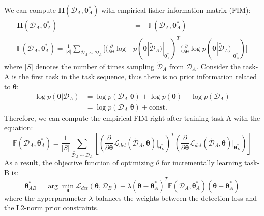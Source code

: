 \documentclass{article}
\begin{document}
We can compute $\boldsymbol{H}(\mathcal D_A, \boldsymbol{\theta}_A^*)$
with empirical fisher information matrix (FIM):
\begin{equation}
\begin{split}
\boldsymbol{H}(\mathcal D_A, \boldsymbol{\theta}_A^*)
&= - \mathbb{F}(\mathcal D_A, \boldsymbol{\theta}_A^*) \\
\mathbb{F}(\mathcal D_A, \boldsymbol{\theta}_A^*)
= \frac{1}{|S|}
\sum_{\tilde{\mathcal D}_A \sim \mathcal D_A}
[(\frac{\partial}{\partial \boldsymbol{\theta}} \log& p(\boldsymbol{\theta}|\tilde{\mathcal D}_A)|_{\boldsymbol{\theta}_A^*})^T
(\frac{\partial}{\partial \boldsymbol{\theta}} \log p(\boldsymbol{\theta}|\tilde{\mathcal D}_A)|_{\boldsymbol{\theta}_A^*})]
\end{split}
\end{equation}
where $|S|$ denotes the number of times sampling $\tilde{\mathcal D}_A$ from $\mathcal D_A$.
Consider the task-A is the first task in the task sequence,
thus there is no prior information related to $\boldsymbol{\theta}$:
\begin{equation}
\begin{split}
\log p(\boldsymbol{\theta}|\mathcal D_A) &=
\log p(\mathcal D_A |\boldsymbol{\theta})
+ \log p(\boldsymbol{\theta})
- \log p(\mathcal D_A) \\
&= \log p(\mathcal D_A |\boldsymbol{\theta}) + \text{const.}
\end{split}
\end{equation}
Therefore, we can compute the empirical FIM right after training task-A
with the equation:
\begin{equation}
\mathbb{F}(\mathcal D_A, \boldsymbol{\theta}_A^*)
= \frac{1}{|S|}
\sum_{\tilde{\mathcal D_A} \sim \mathcal D_A}
[(\frac{\partial}{\partial \boldsymbol{\theta}} \mathcal L_{det}(\tilde{\mathcal D_A}, \boldsymbol{\theta})|_{\boldsymbol{\theta_{A}^*}})^T
(\frac{\partial}{\partial \boldsymbol{\theta}} \mathcal L_{det}(\tilde{\mathcal D_A}, \boldsymbol{\theta})|_{\boldsymbol{\theta_{A}^*}})]
\label{eq:empirical_FIM_of_task-A}
\end{equation}
As a result, the objective function of optimizing $\theta$ for incrementally learning task-B is:
\begin{equation}
\boldsymbol{\theta}_{AB}^* = \arg \min_{\boldsymbol{\theta}}
\mathcal L_{det}(\boldsymbol{\theta}, \mathcal D_B) + 
\lambda (\boldsymbol{\theta} - \boldsymbol{\theta}_{A}^*)^T
\mathbb{F}(\mathcal D_A, \boldsymbol{\theta}_A^*)
(\boldsymbol{\theta} - \boldsymbol{\theta}_{A}^*)
\end{equation}
where the hyperparameter $\lambda$ balances the weights between the detection loss and the L2-norm prior constraints.
\end{document}
